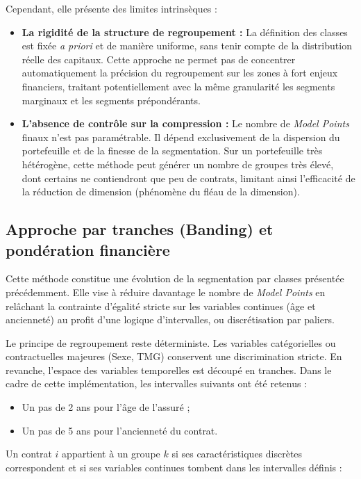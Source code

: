 Cependant, elle présente des limites intrinsèques :
\begin{itemize}
    \item \textbf{La rigidité de la structure de regroupement :} La définition des classes est fixée \textit{a priori} et de manière uniforme, sans tenir compte de la distribution réelle des capitaux. Cette approche ne permet pas de concentrer automatiquement la précision du regroupement sur les zones à fort enjeux financiers, traitant potentiellement avec la même granularité les segments marginaux et les segments prépondérants.
    \item \textbf{L'absence de contrôle sur la compression :} Le nombre de \textit{Model Points} finaux n'est pas paramétrable. Il dépend exclusivement de la dispersion du portefeuille et de la finesse de la segmentation. Sur un portefeuille très hétérogène, cette méthode peut générer un nombre de groupes très élevé, dont certains ne contiendront que peu de contrats, limitant ainsi l'efficacité de la réduction de dimension (phénomène du fléau de la dimension).
\end{itemize}

\subsection{Approche par tranches (Banding) et pondération financière}
\label{sec:banding}

Cette méthode constitue une évolution de la segmentation par classes présentée précédemment. Elle vise à réduire davantage le nombre de \textit{Model Points} en relâchant la contrainte d'égalité stricte sur les variables continues (âge et ancienneté) au profit d'une logique d'intervalles, ou discrétisation par paliers.

Le principe de regroupement reste déterministe. Les variables catégorielles ou contractuelles majeures (Sexe, TMG) conservent une discrimination stricte. En revanche, l'espace des variables temporelles est découpé en tranches. Dans le cadre de cette implémentation, les intervalles suivants ont été retenus :
\begin{itemize}
    \item Un pas de 2 ans pour l'âge de l'assuré ;
    \item Un pas de 5 ans pour l'ancienneté du contrat.
\end{itemize}

Un contrat $i$ appartient à un groupe $k$ si ses caractéristiques discrètes correspondent et si ses variables continues tombent dans les intervalles définis :

